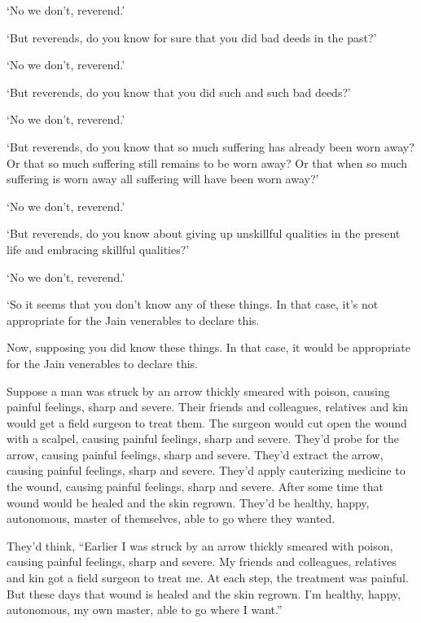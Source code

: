\documentclass[12pt,openany]{book}%
\begin{document}
‘No we don’t, reverend.’ 

‘But reverends, do you know for sure that you did bad deeds in the past?’ 

‘No we don’t, reverend.’ 

‘But reverends, do you know that you did such and such bad deeds?’ 

‘No we don’t, reverend.’ 

‘But reverends, do you know that so much suffering has already been worn away? Or that so much suffering still remains to be worn away? Or that when so much suffering is worn away all suffering will have been worn away?’ 

‘No we don’t, reverend.’ 

‘But reverends, do you know about giving up unskillful qualities in the present life and embracing skillful qualities?’ 

‘No we don’t, reverend.’ 

‘So it seems that you don’t know any of these things. In that case, it’s not appropriate for the Jain venerables to declare this. 

Now, supposing you did know these things. In that case, it would be appropriate for the Jain venerables to declare this. 

Suppose a man was struck by an arrow thickly smeared with poison, causing painful feelings, sharp and severe. Their friends and colleagues, relatives and kin would get a field surgeon to treat them. The surgeon would cut open the wound with a scalpel, causing painful feelings, sharp and severe. They’d probe for the arrow, causing painful feelings, sharp and severe. They’d extract the arrow, causing painful feelings, sharp and severe. They’d apply cauterizing medicine to the wound, causing painful feelings, sharp and severe. After some time that wound would be healed and the skin regrown. They’d be healthy, happy, autonomous, master of themselves, able to go where they wanted. 

They’d think, “Earlier I was struck by an arrow thickly smeared with poison, causing painful feelings, sharp and severe. My friends and colleagues, relatives and kin got a field surgeon to treat me. At each step, the treatment was painful. But these days that wound is healed and the skin regrown. I’m healthy, happy, autonomous, my own master, able to go where I want.” 
\end{document}
